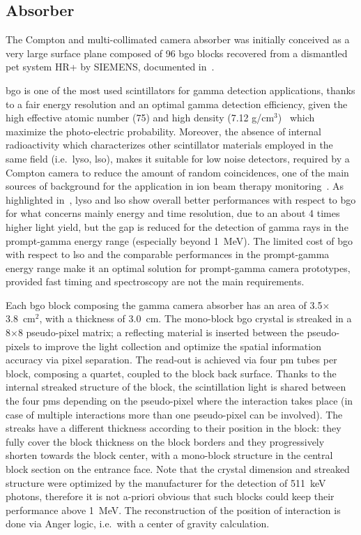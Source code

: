 \subsection{Absorber}\label{chap3::subsec::absorber}

The Compton and multi-collimated camera absorber was initially conceived as a very large surface plane composed of 96 \gls{bgo} blocks recovered from a dismantled \gls{pet} system HR+ by SIEMENS, documented in~\parencite{Adam1997, Brix1997}.

\gls{bgo} is one of the most used scintillators for gamma detection applications, thanks to a fair energy resolution and an optimal gamma detection efficiency, given the high effective atomic number (75) and high density (7.12 g/cm$^3$)~\parencite{Elftmann2015} which maximize the photo-electric probability. Moreover, the absence of internal radioactivity which characterizes other scintillator materials employed in the same field (i.e.~\gls{lyso}, \gls{lso}), makes it suitable for low noise detectors, required by a Compton camera to reduce the amount of random coincidences, one of the main sources of background for the application in ion beam therapy monitoring~\parencite{Ortega2015}. As highlighted in~\parencite{HuesoGonzalez2015}, \gls{lyso} and \gls{lso} show overall better performances with respect to \gls{bgo} for what concerns mainly energy and time resolution, due to an about 4 times higher light yield, but the gap is reduced for the detection of gamma rays in the prompt-gamma energy range (especially beyond 1~MeV). The limited cost of \gls{bgo} with respect to \gls{lso} and the comparable performances in the prompt-gamma energy range make it an optimal solution for prompt-gamma camera prototypes, provided fast timing and spectroscopy are not the main requirements.

Each \gls{bgo} block composing the gamma camera absorber has an area of 3.5$\times$3.8~cm$^2$, with a thickness of 3.0~cm. The mono-block \gls{bgo} crystal is streaked in a 8$\times$8 pseudo-pixel matrix; a reflecting material is inserted between the pseudo-pixels to improve the light collection and optimize the spatial information accuracy via pixel separation. The read-out is achieved via four \gls{pm} tubes per block, composing a quartet, coupled to the block back surface. Thanks to the internal streaked structure of the block, the scintillation light is shared between the four \glspl{pm} depending on the pseudo-pixel where the interaction takes place (in case of multiple interactions more than one pseudo-pixel can be involved). The streaks have a different thickness according to their position in the block: they fully cover the block thickness on the block borders and they progressively shorten towards the block center, with a mono-block structure in the central block section on the entrance face. Note that the crystal dimension and streaked structure were optimized by the manufacturer for the detection of 511~keV photons, therefore it is not a-priori obvious that such blocks could keep their performance above 1~MeV. The reconstruction of the position of interaction is done via Anger logic, i.e.~with a center of gravity calculation.

